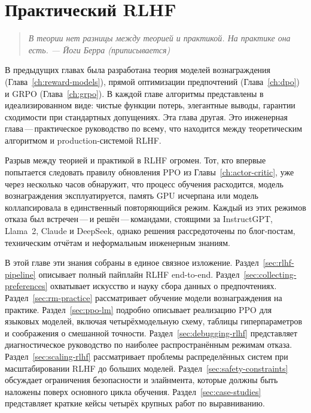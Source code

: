 \chapter{Практический RLHF}
\label{ch:practical-rlhf}

\begin{quote}
\itshape
В теории нет разницы между теорией и практикой. На практике она есть. \upshape --- Йоги Берра (приписывается)
\end{quote}

\bigskip

В предыдущих главах была разработана теория моделей вознаграждения (Глава~\ref{ch:reward-models}), прямой оптимизации предпочтений (Глава~\ref{ch:dpo}) и GRPO (Глава~\ref{ch:grpo}). В каждой главе алгоритмы представлены в идеализированном виде: чистые функции потерь, элегантные выводы, гарантии сходимости при стандартных допущениях. Эта глава другая. Это инженерная глава\,---\,практическое руководство по всему, что находится между теоретическим алгоритмом и production-системой RLHF.

Разрыв между теорией и практикой в RLHF огромен. Тот, кто впервые попытается следовать правилу обновления PPO из Главы~\ref{ch:actor-critic}, уже через несколько часов обнаружит, что процесс обучения расходится, модель вознаграждения эксплуатируется, память GPU исчерпана или модель коллапсировала в единственный повторяющийся режим. Каждый из этих режимов отказа был встречен\,---\,и решён\,---\,командами, стоящими за InstructGPT, Llama~2, Claude и DeepSeek, однако решения рассредоточены по блог-постам, техническим отчётам и неформальным инженерным знаниям.

В этой главе эти знания собраны в единое связное изложение. Раздел~\ref{sec:rlhf-pipeline} описывает полный пайплайн RLHF end-to-end. Раздел~\ref{sec:collecting-preferences} охватывает искусство и науку сбора данных о предпочтениях. Раздел~\ref{sec:rm-practice} рассматривает обучение модели вознаграждения на практике. Раздел~\ref{sec:ppo-lm} подробно описывает реализацию PPO для языковых моделей, включая четырёхмодельную схему, таблицы гиперпараметров и соображения о смешанной точности. Раздел~\ref{sec:debugging-rlhf} представляет диагностическое руководство по наиболее распространённым режимам отказа. Раздел~\ref{sec:scaling-rlhf} рассматривает проблемы распределённых систем при масштабировании RLHF до больших моделей. Раздел~\ref{sec:safety-constraints} обсуждает ограничения безопасности и элайнмента, которые должны быть наложены поверх основного цикла обучения. Раздел~\ref{sec:case-studies} представляет краткие кейсы четырёх крупных работ по выравниванию.

